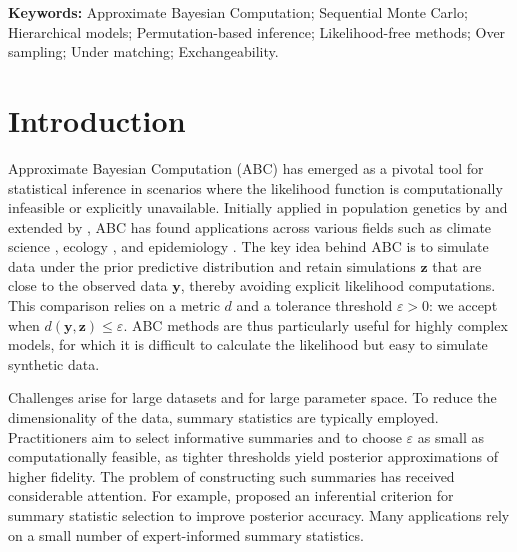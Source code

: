 \documentclass[11pt,a4paper]{article}
\def\obsdata{\mathbf{y}}
\def\simdata{\mathbf{z}}
\theoremstyle{plain}
\theoremstyle{definition}
\theoremstyle{remark}
\begin{document}
\textbf{Keywords:} Approximate Bayesian Computation; Sequential Monte Carlo; Hierarchical models; Permutation-based inference; Likelihood-free methods; Over sampling; Under matching; Exchangeability.

\section{Introduction}

Approximate Bayesian Computation (ABC) \citep{marinApproximateBayesianComputational2012a} has emerged as a pivotal tool for statistical inference in scenarios where the likelihood function is computationally infeasible or explicitly unavailable. Initially applied in population genetics by \citet{tavareInferringCoalescenceTimes1997} and extended by \citet{pritchardPopulationGrowthHuman1999a}, ABC has found applications across various fields such as climate science \citep{holden2018abc}, ecology \citep{piccioni2022calibration}, and epidemiology \citep{sissonHandbookApproximateBayesian2018}. The key idea behind ABC is to simulate data under the prior predictive distribution and retain simulations $\simdata$ that are close to the observed data $\obsdata$, thereby avoiding explicit likelihood computations. This comparison relies on a metric $d$ and a tolerance threshold $\varepsilon > 0$: we accept when $d(\obsdata, \simdata)\leq\varepsilon$. ABC methods are thus particularly useful for highly complex models, for which it is difficult to calculate the likelihood but easy to simulate synthetic data.

Challenges arise for large datasets and for large parameter space. 
To reduce the dimensionality of the data, summary statistics are typically employed. Practitioners aim to select informative summaries and to choose $\varepsilon$ as small as computationally feasible, as tighter thresholds yield posterior approximations of higher fidelity. The problem of constructing such summaries has received considerable attention. For example, \citet{fearnheadConstructingSummaryStatistics2012} proposed an inferential criterion for summary statistic selection to improve posterior accuracy. Many applications rely on a small number of expert-informed summary statistics.
\end{document}
